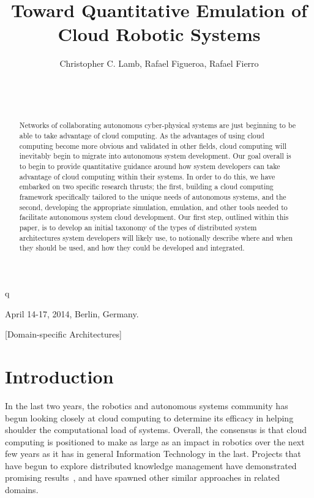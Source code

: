\documentclass{sig-alternate}
\begin{document}
\title{Toward Quantitative Emulation of Cloud Robotic Systems}q


\author{
\alignauthor
Christopher C. Lamb, Rafael Figueroa, Rafael Fierro\\
       \\
       \\
       \\
}

 {April 14-17, 2014, Berlin, Germany.} 

\maketitle

\begin{abstract}
Networks of collaborating autonomous cyber-physical systems are just beginning to be able to take advantage of cloud computing.  As the advantages of using cloud computing become more obvious and validated in other fields, cloud computing will inevitably begin to migrate into autonomous system development.  Our goal overall is to begin to provide quantitative guidance around how system developers can take advantage of cloud computing within their systems.  In order to do this, we have embarked on two specific research thrusts; the first, building a cloud computing framework specifically tailored to the unique needs of autonomous systems, and the second, developing the appropriate simulation, emulation, and other tools needed to facilitate autonomous system cloud development.  Our first step, outlined within this paper, is to develop an initial taxonomy of the types of distributed system architectures system developers will likely use, to notionally describe where and when they should be used, and how they could be developed and integrated.
\end{abstract}

[Domain-specific Architectures]

\section{Introduction}
In the last two years, the robotics and autonomous systems community has begun looking closely at cloud computing to determine its efficacy in helping shoulder the computational load of systems.  Overall, the consensus is that cloud computing is positioned to make as large as an impact in robotics over the next few years as it has in general Information Technology in the last.  Projects that have begun to explore distributed knowledge management have demonstrated promising results~\cite{TeKlPaBe:11, TePeLaBe:12, WaBeCiDa:11}, and have spawned other similar approaches in related domains.  
\end{document}
